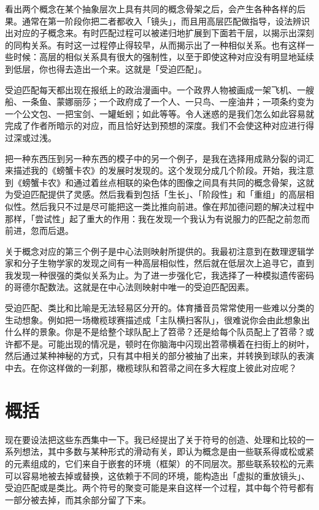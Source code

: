 \documentclass[
  12pt,
  twoside,
  openright,
  oldfontcommands,
]{memoir}
\begin{document}
看出两个概念在某个抽象层次上具有共同的概念骨架之后，会产生各种各样的后果。通常在第一阶段你把二者都收入「镜头」，而且用高层匹配做指导，设法辨识出对应的子概念来。有时匹配过程可以被递归地扩展到下面若干层，以揭示出深刻的同构关系。有时这一过程停止得较早，从而揭示出了一种相似关系。也有这样一些时候：高层的相似关系具有很大的强制性，以至于即使这种对应没有明显地延续到低层，你也得去造出一个来。这就是「受迫匹配」。

受迫匹配每天都出现在报纸上的政治漫画中。一个政界人物被画成一架飞机、一艘船、一条鱼、蒙娜丽莎；一个政府成了一个人、一只鸟、一座油井；一项条约变为一个公文包、一把宝剑、一罐蚯蚓；如此等等。令人迷惑的是我们怎么如此容易就完成了作者所暗示的对应，而且恰好达到预想的深度。我们不会使这种对应进行得过深或过浅。

把一种东西压到另一种东西的模子中的另一个例子，是我在选择用成熟分裂的词汇来描述我的《螃蟹卡农》的发展时发现的。这个发现分成几个阶段。开始，我注意到《螃蟹卡农》和通过着丝点相联的染色体的图像之间具有共同的概念骨架，这就为受迫匹配提供了灵感。然后我看到包括「生长」、「阶段性」和「重组」的高层相似性。然后我只不过是尽可能把这一类比推向前进。像在邦加德问题的解决过程中那样，「尝试性」起了重大的作用：我在发现一个我认为有说服力的匹配之前忽而前进，忽而后退。

关于概念对应的第三个例子是中心法则映射所提供的。我最初注意到在数理逻辑学家和分子生物学家的发现之间有一种高层相似性，然后就在低层次上追寻它，直到我发现一种很强的类似关系为止。为了进一步强化它，我选择了一种模拟遗传密码的哥德尔配数法。这就是在中心法则映射中唯一的受迫匹配因素。

受迫匹配、类比和比喻是无法轻易区分开的。体育播音员常常使用一些难以分类的生动想象。例如把一场橄榄球赛描述成「主队横扫客队」，很难说你会由此想象出什么样的景象。你是不是给整个球队配上了笤帚？还是给每个队员配上了笤帚？或许都不是。可能出现的情况是，顿时在你脑海中闪现出笤帚横着在扫街上的树叶，然后通过某种神秘的方式，只有其中相关的部分被抽了出来，并转换到球队的表演中去。在你这样做的一刹那，橄榄球队和笤帚之间在多大程度上彼此对应呢？

\section{概括}

现在要设法把这些东西集中一下。我已经提出了关于符号的创造、处理和比较的一系列想法，其中多数与某种形式的滑动有关，即认为概念是由一些联系得或松或紧的元素组成的，它们来自于嵌套的环境（框架）的不同层次。那些联系较松的元素可以容易地被去掉或替换，这依赖于不同的环境，能构造出「虚拟的重放镜头」、受迫匹配或是类比。两个符号的聚变可能是来自这样一个过程，其中每个符号都有一部分被去掉，而其余部分留了下来。
\end{document}
